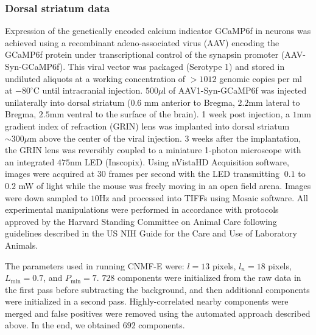 \documentclass[9pt,lineno]{elife}
\begin{document}

\subsubsection{Dorsal striatum data}
Expression of the genetically encoded calcium indicator GCaMP6f in neurons was achieved using a recombinant adeno-associated virus (AAV) encoding the GCaMP6f protein under transcriptional control of the synapsin promoter (AAV-Syn-GCaMP6f). This viral vector was packaged (Serotype 1) and stored in undiluted aliquots at a working concentration of $>1012$ genomic copies per ml at $-80^\circ$C until intracranial injection. $500\mu$l of AAV1-Syn-GCaMP6f was injected unilaterally into dorsal striatum ($0.6$ mm anterior to Bregma, $2.2$mm lateral to Bregma, $2.5$mm ventral to the surface of the brain). 1 week post injection, a $1$mm gradient index of refraction (GRIN) lens was implanted into dorsal striatum $\sim 300\mu$m above the center of the viral injection. 3 weeks after the implantation, the GRIN lens was reversibly coupled to a miniature 1-photon microscope with an integrated $475$nm LED (Inscopix).  Using nVistaHD Acquisition software, images were acquired at 30 frames per second with the LED transmitting $~0.1$ to $0.2$ mW of light while the mouse was freely moving in an open field arena. Images were down sampled to $10$Hz and processed into TIFFs using Mosaic software. All experimental manipulations were performed in accordance with protocols approved by the Harvard Standing Committee on Animal Care following guidelines described in the US NIH Guide for the Care and Use of Laboratory Animals. 

The parameters used in running CNMF-E were: $l=13$ pixels, $l_n=18$ pixels, $L_{\min}=0.7$, and $P_{\min}=7$. $728$ components were initialized from the raw data in the first pass before subtracting the background, and then additional components were initialized in a second pass. Highly-correlated nearby components were merged and false positives were removed using the automated approach described above. In the end, we obtained $692$ components. %
\end{document}
